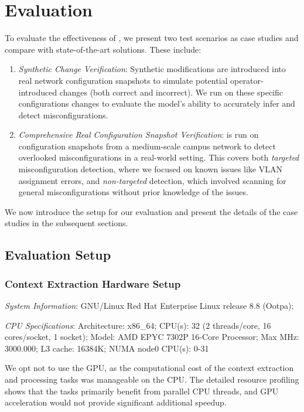 \section{Evaluation}
\label{sec:eval}
To evaluate the effectiveness of \sysname{}, we present two test scenarios as case studies and compare \sysname{} with state-of-the-art solutions. These include:

\begin{enumerate}
    \item \textit{Synthetic Change Verification}: Synthetic modifications are introduced into real network configuration snapshots to simulate potential operator-introduced changes (both correct and incorrect). We run \sysname{} on these specific configurations changes to evaluate the model’s ability to accurately infer and detect misconfigurations.
    \item \textit{Comprehensive Real Configuration Snapshot Verification}: \sysname{} is run on configuration snapshots from a medium-scale campus network to detect overlooked misconfigurations in a real-world setting. This covers both \textit{targeted} misconfiguration detection, where we focused on known issues like VLAN assignment errors, and \textit{non-targeted} detection, which involved scanning for general misconfigurations without prior knowledge of the issues.
\end{enumerate}

We now introduce the setup for our evaluation and present the details of the case studies in the subsequent sections.


\subsection{Evaluation Setup}
\subsubsection{Context Extraction Hardware Setup}


\textit{System Information}: GNU/Linux Red Hat Enterprise Linux release 8.8 (Ootpa);

\textit{CPU Specifications}: Architecture: x86\_64; CPU(s): 32 (2 threads/core, 16 cores/socket, 1 socket); Model: AMD EPYC 7302P 16-Core Processor; Max MHz: 3000.000; L3 cache: 16384K; NUMA node0 CPU(s): 0-31 

We opt not to use the GPU, as the computational cost of the context extraction and processing tasks was manageable on the CPU. The detailed resource profiling shows that the tasks primarily benefit from parallel CPU threads, and GPU acceleration would not provide significant additional speedup.


